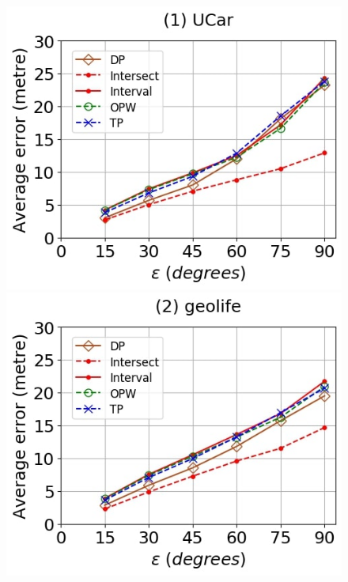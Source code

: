 {\begin{figure}[tb!]
	\centering
	\includegraphics[scale = 0.250]{Figures/Exp-where-DAD-error-epsilon-service.jpg}\hspace{0.5ex}
	\includegraphics[scale = 0.250]{Figures/Exp-where-DAD-error-epsilon-geolife.jpg}\hspace{0.5ex}

\end{figure}}
